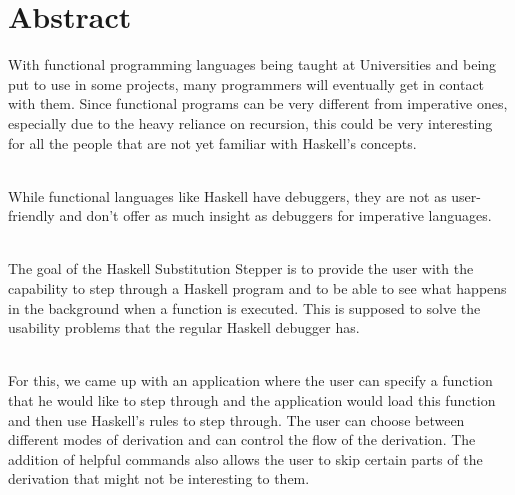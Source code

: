 \chapter*{Abstract}

With functional programming languages being taught at Universities and being put to use in some projects,
many programmers will eventually get in contact with them.
Since functional programs can be very different from imperative ones,
especially due to the heavy reliance on recursion,
this could be very interesting for all the people that are not yet familiar with Haskell's concepts.

\ \\
While functional languages like Haskell have debuggers,
they are not as user-friendly and don't offer as much insight as debuggers for imperative languages.

\ \\
The goal of the Haskell Substitution Stepper is to provide the user with the capability to step through a Haskell program
and to be able to see what happens in the background when a function is executed.
This is supposed to solve the usability problems that the regular Haskell debugger has.

\ \\
For this, we came up with an application where the user can specify a function that he would like to step through
and the application would load this function and then use Haskell's rules to step through.
The user can choose between different modes of derivation and can control the flow of the derivation.
The addition of helpful commands also allows the user to skip certain parts of the derivation that might not be interesting to them.
